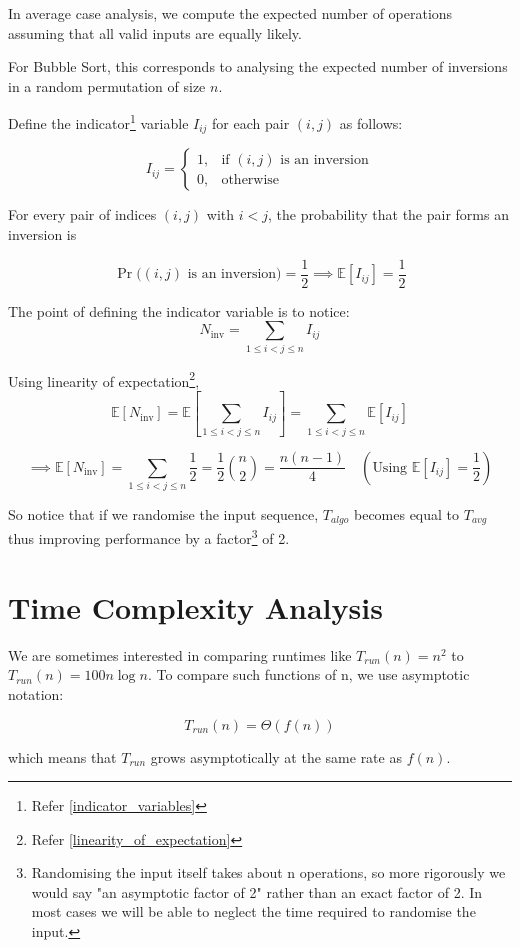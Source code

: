 \documentclass[11pt,openany]{book}
\begin{document}
In average case analysis, we compute the expected number of operations assuming that all valid inputs are equally likely.

For Bubble Sort, this corresponds to analysing the expected number of inversions in a random permutation of size \(n\). 

\noindent Define the indicator\footnote{Refer \autoref{indicator_variables}} variable $I_{ij}$ for each pair \((i,j)\) as follows:

\[
I_{ij}=
\begin{cases}
1,&\text{if }(i,j)\text{ is an inversion}\\
0,&\text{otherwise}
\end{cases}
\]

For every pair of indices \((i,j)\) with \(i<j\), the probability that the pair forms an inversion is

\[
\Pr\big((i,j)\text{ is an inversion}\big)=\frac{1}{2} \implies \mathbb{E}[I_{ij}]
=
\frac{1}{2}
\]

The point of defining the indicator variable is to notice:
\[
N_{\mathrm{inv}}=\sum_{1\le i<j\le n}I_{ij}
\]

Using linearity of expectation\footnote{Refer \autoref{linearity_of_expectation}}, 
\[
\mathbb{E}[N_{\mathrm{inv}}]
=
\mathbb{E}\left[\sum_{1\le i<j\le n}I_{ij}\right]
=
\sum_{1\le i<j\le n}\mathbb{E}[I_{ij}]
\]


\[
\implies
\mathbb{E}[N_{\mathrm{inv}}]
=
\sum_{1\le i<j\le n}\frac{1}{2}
=
\frac{1}{2}\binom{n}{2}
=
\frac{n(n-1)}{4} \quad
\left(\text{Using }\mathbb{E}[I_{ij}]
=
\frac{1}{2}\right)
\]


So notice that if we randomise the input sequence, $T_{algo}$ becomes equal to $T_{avg}$ thus improving performance by a factor\footnote{Randomising the input itself takes about n operations, so more rigorously 
we would say "an asymptotic factor of 2" rather than an exact factor of 2. 
In most cases we will be able to neglect the time required to randomise the input.} of 2.
\section{Time Complexity Analysis}

We are sometimes interested in comparing runtimes like $T_{run}(n)=n^2$ to $T_{run}(n)=100n\log n$.
To compare such functions of n, we use asymptotic notation:

\[
T_{run}(n)=\Theta(f(n))
\]

which means that \(T_{run}\) grows asymptotically at the same rate as \(f(n)\).\\
\end{document}
